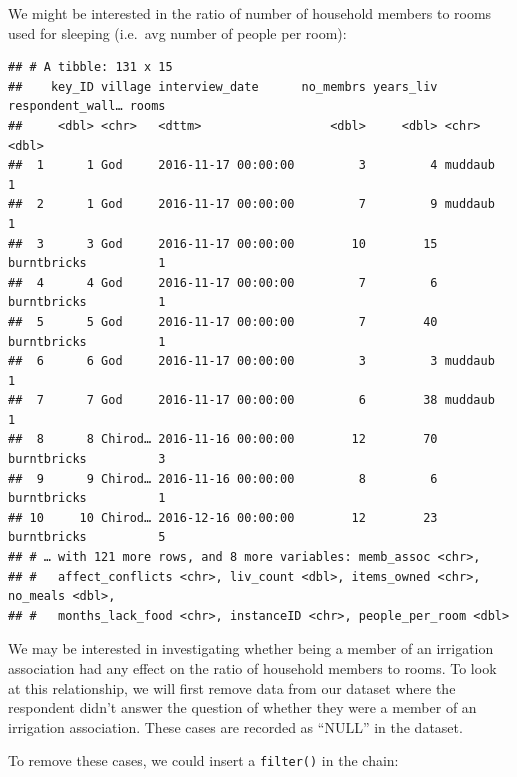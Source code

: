 \documentclass[]{book}
\newenvironment{Shaded}{\begin{snugshade}}{\end{snugshade}}
\newcommand{\KeywordTok}[1]{\textcolor[rgb]{0.13,0.29,0.53}{\textbf{#1}}}
\newcommand{\DataTypeTok}[1]{\textcolor[rgb]{0.13,0.29,0.53}{#1}}
\newcommand{\StringTok}[1]{\textcolor[rgb]{0.31,0.60,0.02}{#1}}
\newcommand{\OperatorTok}[1]{\textcolor[rgb]{0.81,0.36,0.00}{\textbf{#1}}}
\newcommand{\NormalTok}[1]{#1}
\begin{document}
We might be interested in the ratio of number of household members to
rooms used for sleeping (i.e.~avg number of people per room):

\begin{Shaded}
\end{Shaded}

\begin{verbatim}
## # A tibble: 131 x 15
##    key_ID village interview_date      no_membrs years_liv respondent_wall… rooms
##     <dbl> <chr>   <dttm>                  <dbl>     <dbl> <chr>            <dbl>
##  1      1 God     2016-11-17 00:00:00         3         4 muddaub              1
##  2      1 God     2016-11-17 00:00:00         7         9 muddaub              1
##  3      3 God     2016-11-17 00:00:00        10        15 burntbricks          1
##  4      4 God     2016-11-17 00:00:00         7         6 burntbricks          1
##  5      5 God     2016-11-17 00:00:00         7        40 burntbricks          1
##  6      6 God     2016-11-17 00:00:00         3         3 muddaub              1
##  7      7 God     2016-11-17 00:00:00         6        38 muddaub              1
##  8      8 Chirod… 2016-11-16 00:00:00        12        70 burntbricks          3
##  9      9 Chirod… 2016-11-16 00:00:00         8         6 burntbricks          1
## 10     10 Chirod… 2016-12-16 00:00:00        12        23 burntbricks          5
## # … with 121 more rows, and 8 more variables: memb_assoc <chr>,
## #   affect_conflicts <chr>, liv_count <dbl>, items_owned <chr>, no_meals <dbl>,
## #   months_lack_food <chr>, instanceID <chr>, people_per_room <dbl>
\end{verbatim}

We may be interested in investigating whether being a member of an
irrigation association had any effect on the ratio of household members
to rooms. To look at this relationship, we will first remove data from
our dataset where the respondent didn't answer the question of whether
they were a member of an irrigation association. These cases are
recorded as ``NULL'' in the dataset.

To remove these cases, we could insert a \texttt{filter()} in the chain:

\begin{Shaded}
\end{Shaded}
\end{document}
